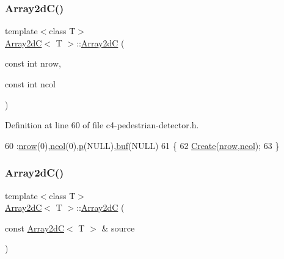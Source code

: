 \subsubsection{\texorpdfstring{Array2d\+C()}{Array2dC()}\hspace{0.1cm}{\footnotesize\ttfamily [2/3]}}
{\footnotesize\ttfamily template$<$class T$>$ \\
\mbox{\hyperlink{class_array2d_c}{Array2dC}}$<$ T $>$\+::\mbox{\hyperlink{class_array2d_c}{Array2dC}} (\begin{DoxyParamCaption}\item[{const int}]{nrow,  }\item[{const int}]{ncol }\end{DoxyParamCaption})\hspace{0.3cm}{\ttfamily [inline]}}



Definition at line 60 of file c4-\/pedestrian-\/detector.\+h.


\begin{DoxyCode}
60                                            :\mbox{\hyperlink{class_array2d_c_a12f690f7195f7674a86a7e1eedbc473c}{nrow}}(0),\mbox{\hyperlink{class_array2d_c_a27e0f8f40f644831cd7c750db59dc28a}{ncol}}(0),\mbox{\hyperlink{class_array2d_c_a727eae5d663d463635cc150e6f771f0d}{p}}(NULL),\mbox{\hyperlink{class_array2d_c_a25d8fa5049d4c7ded126e0acdd18f37a}{buf}}(NULL)
61     \{
62         \mbox{\hyperlink{class_array2d_c_abfe87be7641dfc586b9e7bffebcca9ec}{Create}}(\mbox{\hyperlink{class_array2d_c_a12f690f7195f7674a86a7e1eedbc473c}{nrow}},\mbox{\hyperlink{class_array2d_c_a27e0f8f40f644831cd7c750db59dc28a}{ncol}});
63     \}
\end{DoxyCode}
\mbox{\label{class_array2d_c_aeeeddbaec65066f750615a130ef0f9da}} 
\subsubsection{\texorpdfstring{Array2d\+C()}{Array2dC()}\hspace{0.1cm}{\footnotesize\ttfamily [3/3]}}
{\footnotesize\ttfamily template$<$class T$>$ \\
\mbox{\hyperlink{class_array2d_c}{Array2dC}}$<$ T $>$\+::\mbox{\hyperlink{class_array2d_c}{Array2dC}} (\begin{DoxyParamCaption}\item[{const \mbox{\hyperlink{class_array2d_c}{Array2dC}}$<$ T $>$ \&}]{source }\end{DoxyParamCaption})}



